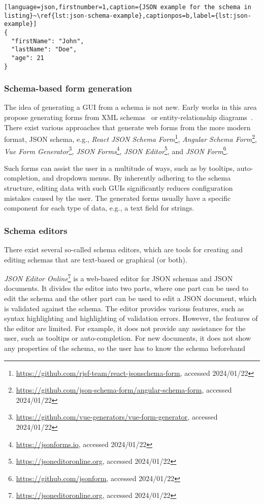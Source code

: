 \begin{lstlisting}[language=json,firstnumber=1,caption={JSON example for the schema in listing}~\ref{lst:json-schema-example},captionpos=b,label={lst:json-example}]
{
  "firstName": "John",
  "lastName": "Doe",
  "age": 21
}
\end{lstlisting}



\subsubsection{Schema-based form generation} %

The idea of generating a GUI from a schema is not new.
Early works in this area propose generating forms from XML schemas~\cite{kasarda2010generating, fenech2008semantic,
    kuo2005generating} or entity-relationship diagrams~\cite{bajaj2009user}.
There exist various approaches that generate web forms from the more modern format, JSON schema, e.g.,
\textit{React JSON Schema Form}\footnote{\url{https://github.com/rjsf-team/react-jsonschema-form}, accessed 2024/01/22},
\textit{Angular Schema Form}\footnote{\url{https://github.com/json-schema-form/angular-schema-form}, accessed 2024/01/22},
\textit{Vue Form Generator}\footnote{\url{https://github.com/vue-generators/vue-form-generator}, accessed 2024/01/22},
\textit{JSON Forms}\footnote{\url{https://jsonforms.io}, accessed 2024/01/22},
\textit{JSON Editor}\footnote{\url{https://jsoneditoronline.org}, accessed 2024/01/22}, and
\textit{JSON Form}\footnote{\url{https://github.com/jsonform}, accessed 2024/01/22}.

Such forms can assist the user in a multitude of ways, such as by tooltips, auto-completion, and dropdown menus.
By inherently adhering to the schema structure, editing data with such GUIs significantly reduces configuration mistakes caused by the user.
The generated forms usually have a specific component for each type of data, e.g., a text field for strings.




\subsubsection{Schema editors}
There exist several so-called schema editors, which are tools for creating and editing schemas that are text-based or graphical (or both).

\textit{JSON Editor Online}\footnote{\url{https://jsoneditoronline.org}, accessed 2024/01/22} is a web-based editor for JSON schemas and JSON documents.
It divides the editor into two parts, where one part can be used to edit the schema and the other part can be used to edit a JSON document,
which is validated against the schema.
The editor provides various features, such as syntax highlighting and highlighting of validation errors. 
However, the features of the editor are limited.
For example, it does not provide any assistance for the user, such as tooltips or auto-completion.
For new documents, it does not show any properties of the schema, so the user has to know the schema beforehand

